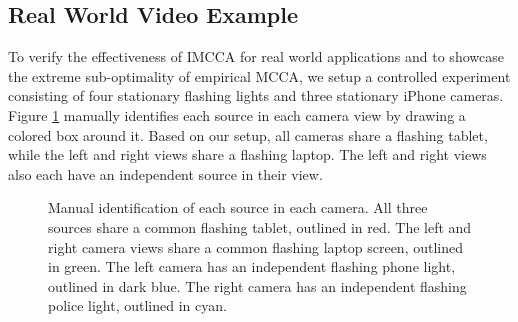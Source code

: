 \subsection{Real World Video Example}\label{sec:real}

To verify the effectiveness of IMCCA for real world applications and to showcase the
extreme sub-optimality of empirical MCCA, we setup a controlled experiment consisting of
four stationary flashing lights and three stationary iPhone cameras. Figure
\ref{fig:chpt10:mcca_sources} manually identifies each source in each camera view by
drawing a colored box around it. Based on our setup, all cameras share a flashing tablet,
while the left and right views share a flashing laptop. The left and right views also each
have an independent source in their view.

\begin{figure}
  \begin{center}
    \caption{Manual identification of each source in each camera. All three sources share
      a common flashing tablet, outlined in red. The left and right camera views share a
      common flashing laptop screen, outlined in green. The left camera has an independent
      flashing phone light, outlined in dark blue. The right camera has an independent
      flashing police light, outlined in cyan.}
    \label{fig:chpt10:mcca_sources}
  \end{center}
\end{figure}


